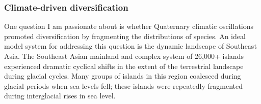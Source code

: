 
\subsubsection*{Climate-driven diversification}
One question I am passionate about is whether Quaternary climatic oscillations
promoted diversification by fragmenting the distributions of species.
An ideal model system for addressing this question is the dynamic landscape of
Southeast Asia.
The Southeast Asian mainland and complex system of 26,000+ islands experienced
dramatic cyclical shifts in the extent of the terrestrial landscape during
glacial cycles.
Many groups of islands in this region coalesced during glacial periods when sea
levels fell; these islands were repeatedly fragmented during interglacial rises
in sea level.


